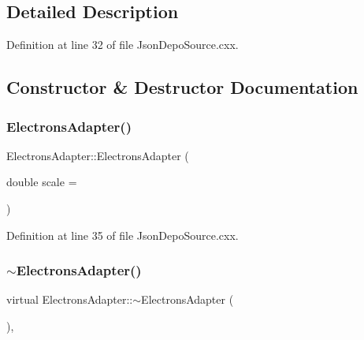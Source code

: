 \subsection{Detailed Description}


Definition at line 32 of file Json\+Depo\+Source.\+cxx.



\subsection{Constructor \& Destructor Documentation}
\mbox{\label{class_electrons_adapter_a2e7e05c3e2b06e8650e44318ae08a39d}} 
\subsubsection{\texorpdfstring{Electrons\+Adapter()}{ElectronsAdapter()}}
{\footnotesize\ttfamily Electrons\+Adapter\+::\+Electrons\+Adapter (\begin{DoxyParamCaption}\item[{double}]{scale = {} }\end{DoxyParamCaption})\hspace{0.3cm}{\ttfamily [inline]}}



Definition at line 35 of file Json\+Depo\+Source.\+cxx.

\mbox{\label{class_electrons_adapter_ad4b000bc102dfcbf83bf01906aeb1cb3}} 
\subsubsection{\texorpdfstring{$\sim$\+Electrons\+Adapter()}{~ElectronsAdapter()}}
{\footnotesize\ttfamily virtual Electrons\+Adapter\+::$\sim$\+Electrons\+Adapter (\begin{DoxyParamCaption}{ }\end{DoxyParamCaption})\hspace{0.3cm}{\ttfamily [inline]}, {\ttfamily [virtual]}}



